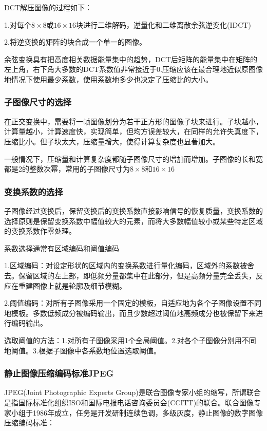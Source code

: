 \documentclass[11pt]{article}
\begin{document}
DCT解压图像的过程如下：

\noindent1.对每个$8\times 8$或$16\times 16$块进行二维解码，逆量化和二维离散余弦逆变化(IDCT)

\noindent2.将逆变换的矩阵的块合成一个单一的图像。

余弦变换具有把高度相关数据能量集中的趋势，DCT后矩阵的能量集中在矩阵的左上角，右下角大多数的DCT系数值非常接近于0.压缩应该在最合理地近似原图像地情况下使用最少系数，使用系数地多少也决定了压缩比的大小。

\subsubsection{子图像尺寸的选择}
在正交变换中，需要将一帧图像划分为若干正方形的图像子块来进行。子块越小，计算量越小，计算速度快，实现简单，但均方误差较大，在同样的允许失真度下，压缩比小。但子块太大，压缩量增大，使得计算复杂度也显著加大。

一般情况下，压缩量和计算复杂度都随子图像尺寸的增加而增加。子图像的长和宽都是2的整数次幂，常用的子图像尺寸为$8\times 8$和$16\times 16$
\subsubsection{变换系数的选择}
子图像经过变换后，保留变换后的变换系数直接影响信号的恢复质量，变换系数的选择原则是保留变换系数中幅值较大的元素，而将大多数幅值较小或某些特定区域的变换系数作零处理。

系数选择通常有区域编码和阈值编码

\noindent1.区域编码：对设定形状的区域内的变换系数进行量化编码，区域外的系数被舍去。保留区域的左上部，即低频分量都集中在此部分，但是高频分量完全丢失，反应在重建图像上就是轮廓及细节模糊。

\noindent2.阈值编码：对所有子图像采用一个固定的模板，自适应地为各个子图像设置不同地模板。多数低频成分被编码输出，而且少数超过阈值地高频成分也被保留下来进行编码输出。

选取阈值的方法：1.对所有子图像采用1个全局阈值。2.对各个子图像分别用不同地阈值。3.根据子图像中各系数地位置选取阈值。

\subsubsection{静止图像压缩编码标准JPEG}
JPEG(Joint Photographic Experts Group)是联合图像专家小组的缩写，所谓联合是指国际标准化组织ISO和国际电报电话咨询委员会(CCITT)的联合。联合图像专家小组于1986年成立，任务是开发研制连续色调，多级灰度，静止图像的数字图像压缩编码标准：
\end{document}
